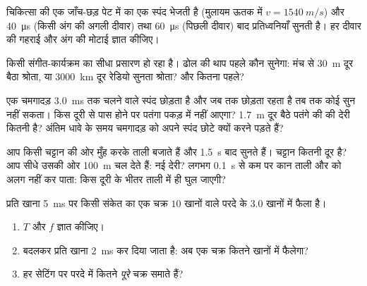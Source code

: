 \begin{exercise}[$\star\star$]\label{exo:g10:signals-and-waves:10}
चिकित्सा की एक जाँच-छड़ पेट में  का एक स्पंद भेजती है
(मुलायम ऊतक में $v = \qty{1540}{m/s}$) और \qty{40}{\micro s} (किसी अंग की अगली दीवार) तथा \qty{60}{\micro s}
(पिछली दीवार) बाद प्रतिध्वनियाँ सुनती है। हर दीवार की गहराई और
अंग की मोटाई ज्ञात कीजिए।
\end{exercise}

\begin{exercise}[$\star\star$]\label{exo:g10:signals-and-waves:11}
किसी संगीत-कार्यक्रम का सीधा प्रसारण हो रहा है। ढोल की थाप पहले कौन
सुनेगा: मंच से \qty{30}{m} दूर बैठा श्रोता, या \qty{3000}{km} दूर रेडियो सुनता
श्रोता? और कितना पहले?
\end{exercise}

\begin{exercise}[$\star\star\star$]\label{exo:g10:signals-and-waves:12}
एक चमगादड़ \qty{3.0}{ms} तक चलने वाले  स्पंद छोड़ता है और
जब तक छोड़ता रहता है तब तक कोई  सुन नहीं सकता। किस
दूरी से पास होने पर पतंगा पकड़ में नहीं आएगा? \qty{1.7}{m} दूर बैठे पतंगे की
 की देरी कितनी है? अंतिम धावे के समय चमगादड़ को अपने
स्पंद छोटे क्यों करने पड़ते हैं?
\end{exercise}

\begin{exercise}[$\star\star\star$]\label{exo:g10:signals-and-waves:13}
आप किसी चट्टान की ओर मुँह करके ताली बजाते हैं और \qty{1.5}{s} बाद
 सुनते हैं। चट्टान कितनी दूर है? आप सीधे उसकी ओर
\qty{100}{m} चल देते हैं: नई देरी? लगभग \qty{0.1}{s} से कम पर कान ताली और
 को अलग नहीं कर पाता: किस दूरी के भीतर
 ताली में ही घुल जाएगी?
\end{exercise}

\begin{exercise}[$\star\star\star$]\label{exo:g10:signals-and-waves:14}
प्रति खाना \qty{5}{ms} पर किसी संकेत का एक चक्र $10$ खानों वाले
परदे के $3.0$ खानों में फैला है।
\begin{enumerate}
  \item $T$ और $f$ ज्ञात कीजिए।
  \item {} बदलकर प्रति खाना \qty{2}{ms} कर दिया जाता है: अब एक
        चक्र कितने खानों में फैलेगा?
  \item हर सेटिंग पर परदे में कितने \emph{पूरे} चक्र समाते हैं?
\end{enumerate}
\end{exercise}

